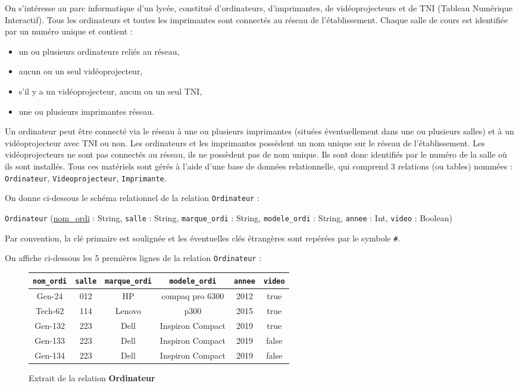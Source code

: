 \documentclass[11pt,a4paper,french,twoside]{PMCours}
\begin{document}
On s'intéresse au parc informatique d'un lycée, constitué d'ordinateurs, d'imprimantes, de vidéoprojecteurs et de TNI (Tableau Numérique Interactif). Tous les ordinateurs et toutes les imprimantes sont connectés au réseau de l'établissement. Chaque salle de cours est identifiée par un numéro unique et contient : 
\begin{itemize}
\item un ou plusieurs ordinateurs reliés au réseau,
\item aucun ou un seul vidéoprojecteur,
\item s'il y a un vidéoprojecteur, aucun ou un seul TNI,
\item une ou plusieurs imprimantes réseau.
\end{itemize}

Un ordinateur peut être connecté via le réseau à une ou plusieurs imprimantes (situées éventuellement dans une ou plusieurs salles) et à un vidéoprojecteur avec TNI ou non.
Les ordinateurs et les imprimantes possèdent un nom unique sur le réseau de l'établissement.
Les vidéoprojecteurs ne sont pas connectés au réseau, ils ne possèdent pas de nom unique. Ils sont donc identifiés par le numéro de la salle où ils sont installés.
Tous ces matériels sont gérés à l'aide d'une base de données relationnelle, qui comprend 3 relations (ou tables) nommées : \verb'Ordinateur', \verb'Videoprojecteur', \verb'Imprimante'.

On donne ci-dessous le schéma relationnel de la relation  \verb'Ordinateur' : 

\verb'Ordinateur' (\underline{nom\_ordi} : String, \verb'salle' : String, \verb'marque_ordi' : String, \verb'modele_ordi' : String, \verb'annee' : Int, \verb'video' : Boolean)

Par convention, la clé primaire est soulignée  et les éventuelles clés étrangères sont repérées par le symbole \verb'#'.

On affiche ci-dessous les 5 premières lignes de la relation \verb'Ordinateur' :
\begin{figure}[h]
\begin{center}
\begin{tabular}[c]{|c|c|c|c|c|c|}\hline
\verb'nom_ordi' & \verb'salle' & \verb'marque_ordi' & \verb'modele_ordi' & \verb'annee' & \verb'video'\\\hline
Gen-24 & 012 & HP & compaq pro 6300 & 2012 & true\\\hline
Tech-62 & 114 & Lenovo & p300 & 2015 & true\\\hline
Gen-132 & 223 & Dell & Inspiron Compact & 2019 & true\\\hline
Gen-133 & 223 & Dell & Inspiron Compact & 2019 & false\\\hline
Gen-134 & 223 & Dell & Inspiron Compact & 2019 & false\\\hline
\end{tabular}
\end{center}
\caption{Extrait de la relation \textbf{Ordinateur}}
\end{figure}
\end{document}

